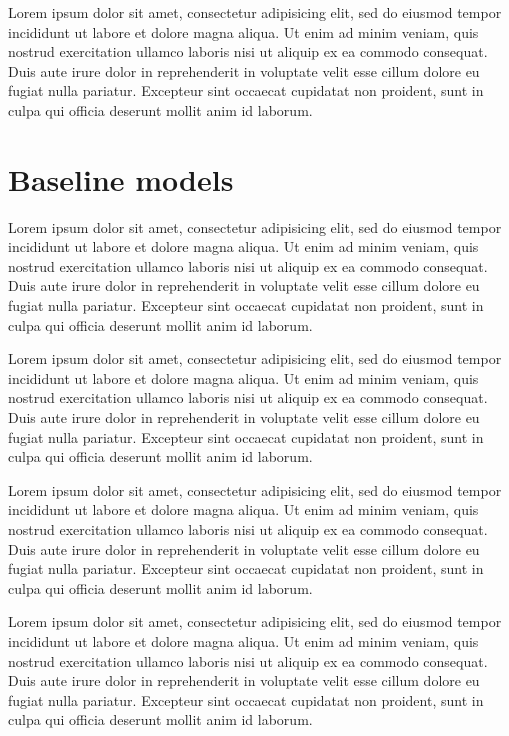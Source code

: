 \documentclass[11pt,letterpaper]{article}
\begin{document}
Lorem ipsum dolor sit amet, consectetur adipisicing elit, sed do eiusmod tempor incididunt ut labore et dolore magna aliqua. Ut enim ad minim veniam, quis nostrud exercitation ullamco laboris nisi ut aliquip ex ea commodo consequat. Duis aute irure dolor in reprehenderit in voluptate velit esse cillum dolore eu fugiat nulla pariatur. Excepteur sint occaecat cupidatat non proident, sunt in culpa qui officia deserunt mollit anim id laborum.

\section{Baseline models}

Lorem ipsum dolor sit amet, consectetur adipisicing elit, sed do eiusmod tempor incididunt ut labore et dolore magna aliqua. Ut enim ad minim veniam, quis nostrud exercitation ullamco laboris nisi ut aliquip ex ea commodo consequat. Duis aute irure dolor in reprehenderit in voluptate velit esse cillum dolore eu fugiat nulla pariatur. Excepteur sint occaecat cupidatat non proident, sunt in culpa qui officia deserunt mollit anim id laborum.

Lorem ipsum dolor sit amet, consectetur adipisicing elit, sed do eiusmod tempor incididunt ut labore et dolore magna aliqua. Ut enim ad minim veniam, quis nostrud exercitation ullamco laboris nisi ut aliquip ex ea commodo consequat. Duis aute irure dolor in reprehenderit in voluptate velit esse cillum dolore eu fugiat nulla pariatur. Excepteur sint occaecat cupidatat non proident, sunt in culpa qui officia deserunt mollit anim id laborum.

Lorem ipsum dolor sit amet, consectetur adipisicing elit, sed do eiusmod tempor incididunt ut labore et dolore magna aliqua. Ut enim ad minim veniam, quis nostrud exercitation ullamco laboris nisi ut aliquip ex ea commodo consequat. Duis aute irure dolor in reprehenderit in voluptate velit esse cillum dolore eu fugiat nulla pariatur. Excepteur sint occaecat cupidatat non proident, sunt in culpa qui officia deserunt mollit anim id laborum.

Lorem ipsum dolor sit amet, consectetur adipisicing elit, sed do eiusmod tempor incididunt ut labore et dolore magna aliqua. Ut enim ad minim veniam, quis nostrud exercitation ullamco laboris nisi ut aliquip ex ea commodo consequat. Duis aute irure dolor in reprehenderit in voluptate velit esse cillum dolore eu fugiat nulla pariatur. Excepteur sint occaecat cupidatat non proident, sunt in culpa qui officia deserunt mollit anim id laborum.
\end{document}
